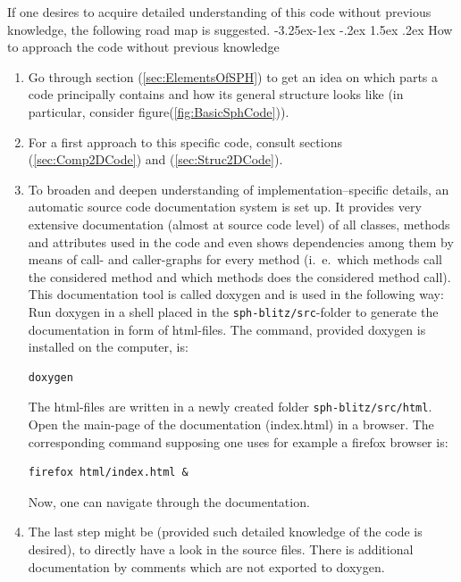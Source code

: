 \documentclass[11pt,a4paper,twoside]{report}
\makeatletter
\renewcommand\paragraph{\@startsection{paragraph}{4}{\z@}%
  {-3.25ex\@plus -1ex \@minus -.2ex}%
  {1.5ex \@plus .2ex}%
  {\normalfont\normalsize\bfseries}}
\makeatother
\begin{document}
If one desires to acquire detailed understanding of this code without previous knowledge, the following road map is suggested.
\paragraph{How to approach the code without previous knowledge}
\begin{enumerate}
 \item Go through section (\ref{sec:ElementsOfSPH}) to get an idea on which parts a code principally contains and how its general structure looks like (in particular, consider figure(\ref{fig:BasicSphCode})).
\item For a first approach to this specific code, consult sections (\ref{sec:Comp2DCode}) and (\ref{sec:Struc2DCode}).
\item To broaden and deepen understanding of implementation--specific details,
an automatic source code documentation system is set up. It provides very extensive documentation (almost at source code level) of all classes, methods and attributes used in the code and even shows dependencies among them by means of call- and caller-graphs for every method (i.\ e.\ which methods call the considered method and which methods does the considered method call).
This documentation tool is called doxygen and is used in the following way:
Run doxygen in a shell placed in the {\tt sph-blitz/src}-folder to generate the documentation in form of html-files. The command, provided doxygen is installed on the computer, is:
\begin{verbatim}
doxygen
\end{verbatim}
The html-files are written in a newly created folder {\tt sph-blitz/src/html}. Open the main-page of the documentation (index.html) in a browser. The corresponding command supposing one uses for example a firefox browser is:
\begin{verbatim}
firefox html/index.html &
\end{verbatim}
Now, one can navigate through the documentation.
\item The last step might be (provided such detailed knowledge of the code is desired), to directly have a look in the source files. There is additional documentation by comments which are not exported to doxygen.
\end{enumerate}
\end{document}
